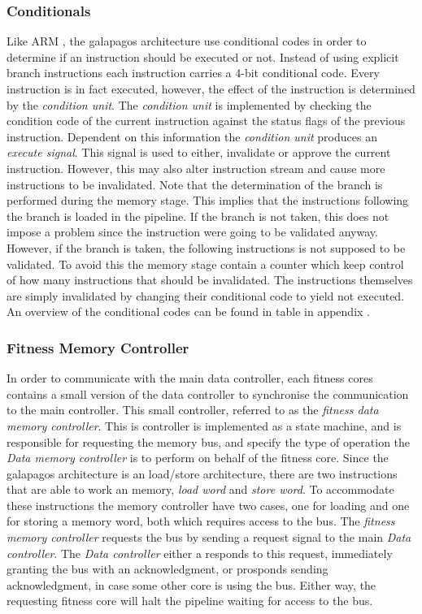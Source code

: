 \subsubsection{Conditionals} 
Like ARM , the galapagos architecture use conditional codes in order to determine if an instruction should be executed or not. Instead of using explicit branch instructions each instruction carries a 4-bit conditional code. Every instruction is in fact executed, however, the effect of the instruction is determined by the \emph{condition unit}. The \emph{condition unit} is implemented by checking the condition code of the current instruction against the status flags of the previous instruction. Dependent on this information the \emph{condition unit} produces an \emph{execute signal}. This signal is used to either, invalidate or approve the current instruction. However, this may also alter instruction stream and cause more instructions to be invalidated. Note that the determination of the branch is performed during the memory stage. This implies      
that the instructions following the branch is loaded in the pipeline. If the branch is not taken, this does not impose a problem since the instruction were going to be validated anyway. However, if the branch is taken, the following instructions is not supposed to be validated. To avoid this the memory stage contain a counter which keep control of how many instructions that should be invalidated. The instructions themselves are simply invalidated by changing their conditional code to yield not executed. An overview of the conditional codes can be found in table  in appendix .




\subsubsection{Fitness Memory Controller} 
In order to communicate with the main data controller, each fitness cores contains a small version of the data controller to synchronise the communication to the main controller. This small controller, referred to as the \emph{fitness data memory controller}. This is controller is implemented as a state machine, and is responsible for requesting the memory bus, and specify the type of operation the \emph{Data memory controller} is to perform on behalf of the fitness core. Since the galapagos architecture is an load/store architecture, there are two instructions that are able to work an memory, \emph{load word} and \emph{store word}. To accommodate these instructions the memory controller have two cases, one for loading and one for storing a memory word, both which requires access to the bus. The \emph{fitness memory controller} requests the bus by sending a request signal to the main \emph{Data controller}. The \emph{Data controller} either a responds to this request, immediately granting the bus with an acknowledgment, or prosponds sending acknowledgment, in case some other core is using the bus. Either way, the requesting fitness core will halt the pipeline waiting for access to the bus. 

